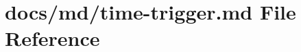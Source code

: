 \hypertarget{time-trigger_8md}{}\section{docs/md/time-\/trigger.md File Reference}
\label{time-trigger_8md}
